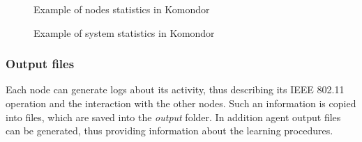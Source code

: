 \documentclass[a4paper]{article}
\begin{document}
\begin{figure}[h!]
	\centering
	\caption{Example of nodes statistics in Komondor}
	\label{fig:nodes_statistics_example}
\end{figure}

\begin{figure}[h!]
	\centering
	\caption{Example of system statistics in Komondor}
	\label{fig:general_statistics_example}
\end{figure}

\subsubsection{Output files}
\label{section:output_files}	
Each node can generate logs about its activity, thus describing its IEEE 802.11 operation and the interaction with the other nodes. Such an information is copied into files, which are saved into the \emph{output} folder. In addition agent output files can be generated, thus providing information about the learning procedures.
\end{document}

